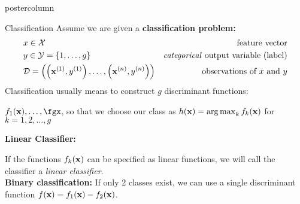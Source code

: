 \documentclass{beamer}
\begin{document}
\begin{frame}[fragile]{}
\begin{columns}
\begin{column}{.31\textwidth}
\begin{beamercolorbox}[center]{postercolumn}
\begin{minipage}{.98\textwidth}
{      		\begin{myblock}{Classification}
%             
            Assume we are given a \textbf{classification problem:}
            \begin{eqnarray*} & x \in \mathcal{X} \quad & \text{feature vector}\\ & y \in \mathcal{Y} = \{1, \ldots, g\} \quad & \text{\emph{categorical} output variable (label)}\\ &\mathcal{D} = \left( \left(\mathbf{x}^{(1)}, y^{(1)}\right), \ldots, \left(\mathbf{x}^{(n)}, y^{(n)}\right)\right) & \text{observations of $x$ and $y$} \end{eqnarray*}
            \vspace*{1ex}
            Classification usually means to construct $g$ discriminant functions:
              
              \hspace*{1ex}$f_1(\xv), \ldots, \fgx$, so that we choose our class as $h(\mathbf{x}) = \operatorname{arg\,max}_k f_{k}(\mathbf{x})$ \hspace*{1ex}for $k = 1, 2,\ldots, g$
              
              \vspace*{1ex}
            
            
            \textbf{Linear Classifier:}
            
            \hspace*{1ex}If the functions $f_{k}(\mathbf{x})$ can be specified as linear functions, we will call \hspace*{1ex}the classifier a \emph{linear classifier}.\\
            
            
            \textbf{Binary classification: }If only 2 classes exist, we can use a single discriminant function $f(\mathbf{x}) = f_{1}(\mathbf{x}) - f_{2}(\mathbf{x})$.  
    
				  \end{myblock}
			  }
			\end{minipage}
		\end{beamercolorbox}
	\end{column}
\end{columns}

\end{frame}
\end{document}
